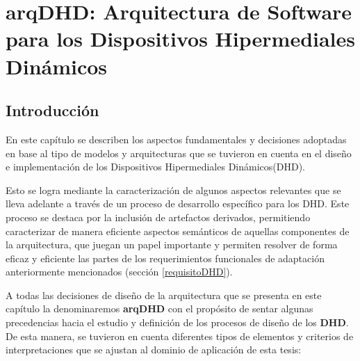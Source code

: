 ﻿%
\chapter{arqDHD: Arquitectura de Software para los Dispositivos Hipermediales Dinámicos}\label{cap:arqdhd}


\section{Introducción}\label{secc:arqDHD_Introduccion}

En este capítulo se describen los aspectos fundamentales y decisiones adoptadas
en base al tipo de modelos y arquitecturas que se tuvieron en cuenta en el
diseño e implementación de los Dispositivos Hipermediales Dinámicos(DHD).

Esto se logra mediante la caracterización  de algunos aspectos relevantes que se lleva adelante a través de un 
proceso de desarrollo específico para los DHD. Este proceso se destaca por la inclusión
de artefactos derivados, permitiendo caracterizar de manera eficiente aspectos semánticos 
de aquellas componentes de la arquitectura, que juegan un papel importante y permiten
resolver de forma eficaz y eficiente las partes de los requerimientos funcionales de adaptación anteriormente mencionados (sección \ref{requisitoDHD}).

A todas las decisiones de diseño de la arquitectura que se presenta en este capítulo la denominaremos \textbf{arqDHD}  con el propósito de
sentar algunas precedencias hacia el estudio y definición de los procesos de diseño de los \textbf{DHD}. De esta manera, se tuvieron en cuenta diferentes tipos de elementos y criterios de interpretaciones que se ajustan al dominio de aplicación de esta tesis:



